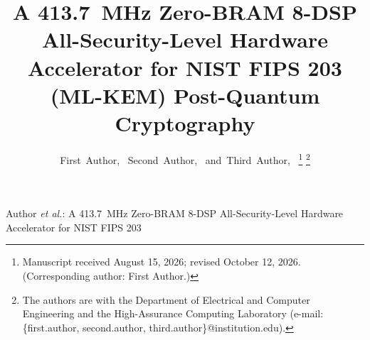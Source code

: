 \documentclass[journal]{IEEEtran}
\begin{document}
\title{A 413.7~MHz Zero-BRAM 8-DSP All-Security-Level Hardware Accelerator for NIST FIPS 203 (ML-KEM) Post-Quantum Cryptography}

\author{First~Author,~
        Second~Author,~
        and~Third~Author,~%
\thanks{Manuscript received August 15, 2026; revised October 12, 2026. (Corresponding author: First Author.)}%
\thanks{The authors are with the Department of Electrical and Computer Engineering and the High-Assurance Computing Laboratory (e-mail: \{first.author, second.author, third.author\}@institution.edu).}%
}

%
{Author \MakeLowercase{\textit{et al.}}: A 413.7~MHz Zero-BRAM 8-DSP All-Security-Level Hardware Accelerator for NIST FIPS 203}

\maketitle
\end{document}
